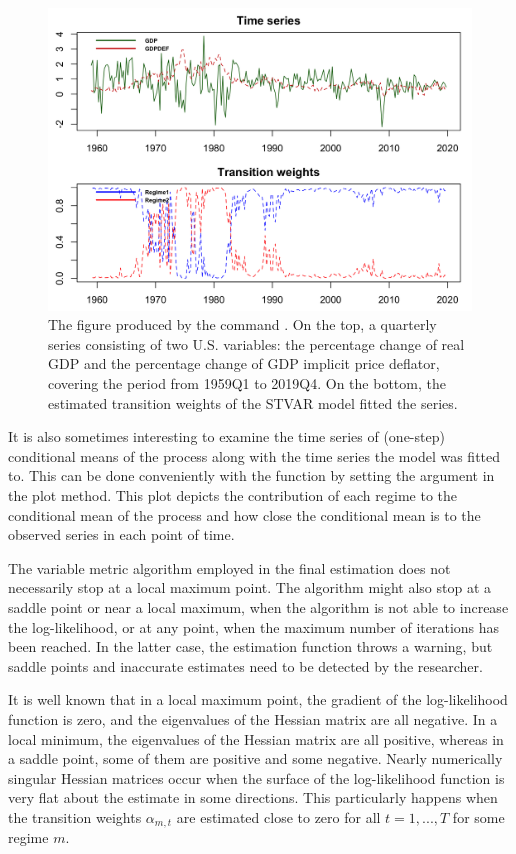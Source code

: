 \documentclass[nojss]{jss}
\begin{document}
\begin{figure}[t]
  \centering
  \includegraphics{figures/seriesplot.png}
  \caption{The figure produced by the command . On the top, a quarterly series consisting of two U.S. variables: the percentage change of real GDP and the percentage change of GDP implicit price deflator, covering the period from 1959Q1 to 2019Q4. On the bottom, the estimated transition weights of the STVAR model  fitted the series.}
\label{fig:seriesplot}\end{figure}

It is also sometimes interesting to examine the time series of (one-step) conditional means of the process along with the time series the model was fitted to. This can be done conveniently with the function by setting the argument  in the plot method. This plot depicts the contribution of each regime to the conditional mean of the process and how close the conditional mean is to the observed series in each point of time.

The variable metric algorithm employed in the final estimation does not necessarily stop at a local maximum point. The algorithm might also stop at a saddle point or near a local maximum, when the algorithm is not able to increase the log-likelihood, or at any point, when the maximum number of iterations has been reached. In the latter case, the estimation function throws a warning, but saddle points and inaccurate estimates need to be detected by the researcher.

It is well known that in a local maximum point, the gradient of the log-likelihood function is zero, and the eigenvalues of the Hessian matrix are all negative. In a local minimum, the eigenvalues of the Hessian matrix are all positive, whereas in a saddle point, some of them are positive and some negative. Nearly numerically singular Hessian matrices occur when the surface of the log-likelihood function is very flat about the estimate in some directions. This particularly happens when the transition weights $\alpha_{m,t}$ are estimated close to zero for all $t=1,...,T$ for some regime $m$.
\end{document}
